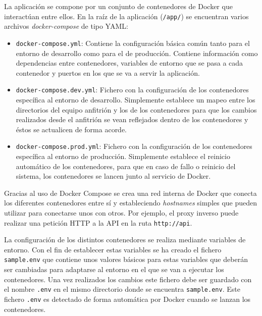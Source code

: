 La aplicación se compone por un conjunto de contenedores de Docker que
interactúan entre ellos. En la raíz de la aplicación (\texttt{/app/}) se
encuentran varios archivos \textit{docker-compose} de tipo YAML:

\begin{itemize}
    \item \texttt{docker-compose.yml}: Contiene la configuración básica común
          tanto para el entorno de desarrollo como para el de producción.
          Contiene información como dependencias entre contenedores, variables
          de entorno que se pasa a cada contenedor y puertos en los que se va a
          servir la aplicación.
    \item \texttt{docker-compose.dev.yml}: Fichero con la configuración de los
          contenedores específica al entorno de desarrollo. Simplemente
          establece un mapeo entre los directorios del equipo anfitrión y los de
          los contenedores para que los cambios realizados desde el anfitrión se
          vean reflejados dentro de los contenedores y éstos se actualicen de
          forma acorde.
    \item \texttt{docker-compose.prod.yml}: Fichero con la configuración de los
          contenedores específica al entorno de producción. Simplemente
          establece el reinicio automático de los contenedores, para que en caso
          de fallo o reinicio del sistema, los contenedores se lancen junto al
          servicio de Docker.
\end{itemize}

Gracias al uso de Docker Compose se crea una red interna de Docker que conecta
los diferentes contenedores entre sí y estableciendo \textit{hostnames} simples
que pueden utilizar para conectarse unos con otros. Por ejemplo, el proxy
inverso puede realizar una petición HTTP a la API en la ruta
\texttt{http://api}.

La configuración de los distintos contenedores se realiza mediante variables de
entorno. Con el fin de establecer estas variables se ha creado el fichero
\texttt{sample.env} que contiene unos valores básicos para estas variables que
deberán ser cambiadas para adaptarse al entorno en el que se van a ejecutar los
contenedores. Una vez realizados los cambios este fichero debe ser guardado con
el nombre \texttt{.env} en el mismo directorio donde se encuentra
\texttt{sample.env}. Este fichero \texttt{.env} es detectado de forma automática
por Docker cuando se lanzan los contenedores.

